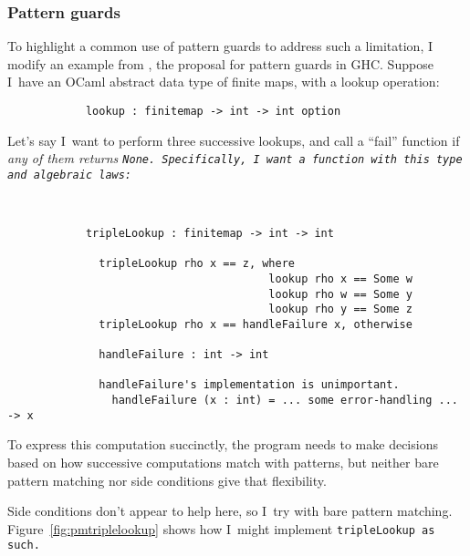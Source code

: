 \documentclass[manuscript,screen,review, 12pt, nonacm]{acmart}
\begin{document}
    \subsubsection{Pattern guards}
    \label{guards}

    To highlight a common use of pattern guards to address such a limitation, I
    modify an example from \citet{guardproposal}, the proposal for pattern
    guards in GHC. Suppose I~have an OCaml abstract data type of finite maps,
    with a lookup operation: 

    \begin{minipage}[t]{\textwidth}
        \centering 
        \begin{verbatim}
            lookup : finitemap -> int -> int option
        \end{verbatim}
    \end{minipage}
    Let's say I~want to perform three successive lookups, and call a “fail”
    function if \it{any} of them returns \tt{None}. Specifically, I~want a
    function with this type and algebraic laws: 

    \begin{minipage}[t]{\textwidth}
        \centering 
        \begin{verbatim}
          

            tripleLookup : finitemap -> int -> int

              tripleLookup rho x == z, where 
                                        lookup rho x == Some w
                                        lookup rho w == Some y
                                        lookup rho y == Some z
              tripleLookup rho x == handleFailure x, otherwise
            
              handleFailure : int -> int 

              handleFailure's implementation is unimportant.
                handleFailure (x : int) = ... some error-handling ... -> x  

        \end{verbatim}
    \end{minipage}

    To express this computation succinctly, the program needs to make decisions
    based on how successive computations match with patterns, but neither bare
    pattern matching nor side conditions give that flexibility. 
    
    Side conditions don't appear to help here, so I~try with bare pattern
    matching. Figure~\ref{fig:pmtriplelookup} shows how I~might implement
    \tt{tripleLookup} as such. 
\end{document}
